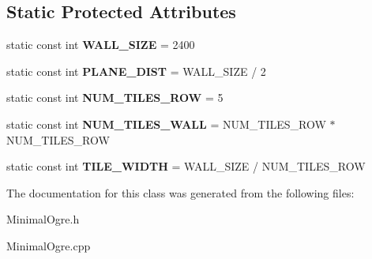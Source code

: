 \subsection*{Static Protected Attributes}
\begin{DoxyCompactItemize}
\item 
\hypertarget{classMinimalOgre_a163f591c74c89db92f3c5a0befcfcf81}{static const int {\bfseries W\-A\-L\-L\-\_\-\-S\-I\-Z\-E} = 2400}\label{classMinimalOgre_a163f591c74c89db92f3c5a0befcfcf81}

\item 
\hypertarget{classMinimalOgre_a43224577d996f097c8148009f2eed73f}{static const int {\bfseries P\-L\-A\-N\-E\-\_\-\-D\-I\-S\-T} = W\-A\-L\-L\-\_\-\-S\-I\-Z\-E / 2}\label{classMinimalOgre_a43224577d996f097c8148009f2eed73f}

\item 
\hypertarget{classMinimalOgre_afd7f005e318e3992944c242a52ae05db}{static const int {\bfseries N\-U\-M\-\_\-\-T\-I\-L\-E\-S\-\_\-\-R\-O\-W} = 5}\label{classMinimalOgre_afd7f005e318e3992944c242a52ae05db}

\item 
\hypertarget{classMinimalOgre_a0aab87488b516828898e0f3bf5b7e202}{static const int {\bfseries N\-U\-M\-\_\-\-T\-I\-L\-E\-S\-\_\-\-W\-A\-L\-L} = N\-U\-M\-\_\-\-T\-I\-L\-E\-S\-\_\-\-R\-O\-W $\ast$ N\-U\-M\-\_\-\-T\-I\-L\-E\-S\-\_\-\-R\-O\-W}\label{classMinimalOgre_a0aab87488b516828898e0f3bf5b7e202}

\item 
\hypertarget{classMinimalOgre_a237f392e4e03311927e12732ff11987e}{static const int {\bfseries T\-I\-L\-E\-\_\-\-W\-I\-D\-T\-H} = W\-A\-L\-L\-\_\-\-S\-I\-Z\-E / N\-U\-M\-\_\-\-T\-I\-L\-E\-S\-\_\-\-R\-O\-W}\label{classMinimalOgre_a237f392e4e03311927e12732ff11987e}

\end{DoxyCompactItemize}


The documentation for this class was generated from the following files\-:\begin{DoxyCompactItemize}
\item 
Minimal\-Ogre.\-h\item 
Minimal\-Ogre.\-cpp\end{DoxyCompactItemize}
